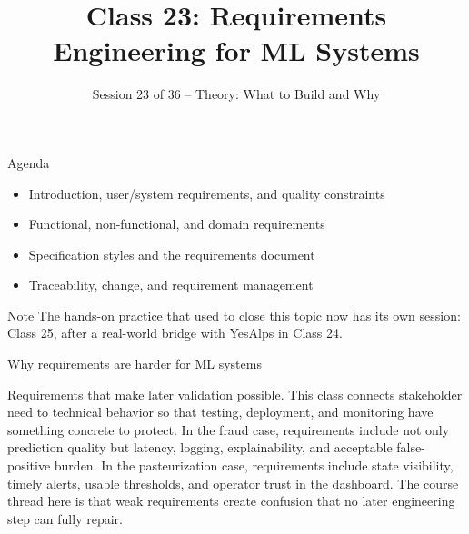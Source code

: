 

\title{Class 23: Requirements Engineering for ML Systems}
\subtitle{Session 23 of 36 -- Theory: What to Build and Why}
\author{\coursename}
\date{}



\frame{\titlepage \coursefooter}

\begin{frame}{Agenda}
\begin{itemize}
\item Introduction, user/system requirements, and quality constraints
\item Functional, non-functional, and domain requirements
\item Specification styles and the requirements document
\item Traceability, change, and requirement management
\end{itemize}
\begin{block}{Note}
The hands-on practice that used to close this topic now has its own session: Class 25, after a real-world bridge with YesAlps in Class 24.
\end{block}
\coursefooter
\end{frame}

\begin{frame}{Why requirements are harder for ML systems}
\coursefooter
\end{frame}

\coursecontextframe
{Requirements that make later validation possible.}
{This class connects stakeholder need to technical behavior so that testing, deployment, and monitoring have something concrete to protect.}
{In the fraud case, requirements include not only prediction quality but latency, logging, explainability, and acceptable false-positive burden.}
{In the pasteurization case, requirements include state visibility, timely alerts, usable thresholds, and operator trust in the dashboard.}
{The course thread here is that weak requirements create confusion that no later engineering step can fully repair.}

